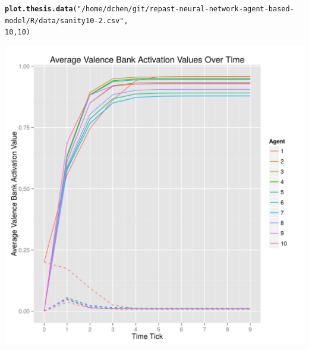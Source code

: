 \documentclass{article}\usepackage[]{graphicx}\usepackage[]{color}
\makeatletter
\def\maxwidth{ %
  \ifdim\Gin@nat@width>\linewidth
    \linewidth
  \else
    \Gin@nat@width
  \fi
}
\newcommand{\hlnum}[1]{\textcolor[rgb]{0.686,0.059,0.569}{#1}}%
\newcommand{\hlstr}[1]{\textcolor[rgb]{0.192,0.494,0.8}{#1}}%
\newcommand{\hlstd}[1]{\textcolor[rgb]{0.345,0.345,0.345}{#1}}%
\newcommand{\hlkwd}[1]{\textcolor[rgb]{0.737,0.353,0.396}{\textbf{#1}}}%
\newenvironment{kframe}{%
 \def\at@end@of@kframe{}%
 \ifinner\ifhmode%
  \def\at@end@of@kframe{\end{minipage}}%
  \begin{minipage}{\columnwidth}%
 \fi\fi%
 \def\FrameCommand##1{\hskip\@totalleftmargin \hskip-\fboxsep
 \colorbox{shadecolor}{##1}\hskip-\fboxsep
     \hskip-\linewidth \hskip-\@totalleftmargin \hskip\columnwidth}%
 \MakeFramed {\advance\hsize-\width
   \@totalleftmargin\z@ \linewidth\hsize
   \@setminipage}}%
 {\par\unskip\endMakeFramed%
 \at@end@of@kframe}
\newenvironment{knitrout}{}{} %
\makeatother
\begin{document}
\newpage
\begin{knitrout}
\color{fgcolor}\begin{kframe}
\begin{alltt}
\hlkwd{plot.thesis.data}\hlstd{(}\hlstr{"/home/dchen/git/repast-neural-network-agent-based-model/R/data/sanity10-2.csv"}\hlstd{,}
    \hlnum{10}\hlstd{,} \hlnum{10}\hlstd{)}
\end{alltt}
\end{kframe}
\includegraphics[width=\maxwidth]{figure/unnamed-chunk-2} 

\end{knitrout}
\end{document}

